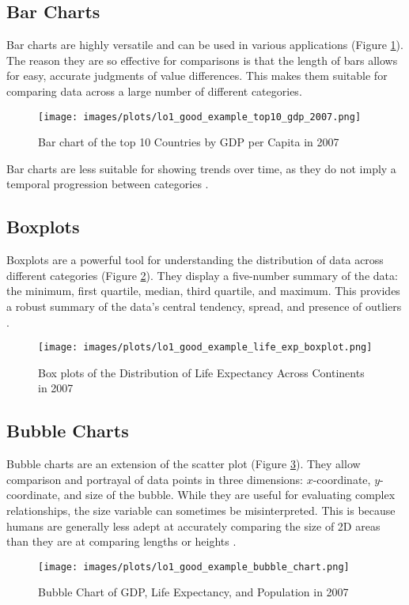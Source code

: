 \subsection{Bar Charts}

Bar charts are highly versatile and can be used in various applications (Figure \ref{fig:bar_chart_good}). The reason they are so effective for comparisons is that the length of bars allows for easy, accurate judgments of value differences. This makes them suitable for comparing data across a large number of different categories.

\begin{figure}[h]
    \centering
    \texttt{[image: images/plots/lo1\_good\_example\_top10\_gdp\_2007.png]}
    \caption{Bar chart of the top 10 Countries by GDP per Capita in 2007}
    \label{fig:bar_chart_good}
\end{figure}

Bar charts are less suitable for showing trends over time, as they do not imply a temporal progression between categories \cite{heerTourVisualizationZoo2010}.

\subsection{Boxplots}

Boxplots are a powerful tool for understanding the distribution of data across different categories (Figure \ref{fig:boxplot_good}). They display a five-number summary of the data: the minimum, first quartile, median, third quartile, and maximum. This provides a robust summary of the data's central tendency, spread, and presence of outliers \cite{tukeyExploratoryDataAnalysis1977}.

\begin{figure}[h]
    \centering
    \texttt{[image: images/plots/lo1\_good\_example\_life\_exp\_boxplot.png]}
    \caption{Box plots of the Distribution of Life Expectancy Across Continents in 2007}
    \label{fig:boxplot_good}
\end{figure}

\subsection{Bubble Charts}

Bubble charts are an extension of the scatter plot (Figure \ref{fig:bubble_chart_good}). They allow comparison and portrayal of data points in three dimensions: $x$-coordinate, $y$-coordinate, and size of the bubble. While they are useful for evaluating complex relationships, the size variable can sometimes be misinterpreted. This is because humans are generally less adept at accurately comparing the size of 2D areas than they are at comparing lengths or heights \cite{clevelandGraphicalPerceptionTheory1984}.

\begin{figure}[h]
    \centering
    \texttt{[image: images/plots/lo1\_good\_example\_bubble\_chart.png]}
    \caption{Bubble Chart of GDP, Life Expectancy, and Population in 2007}
    \label{fig:bubble_chart_good}
\end{figure}